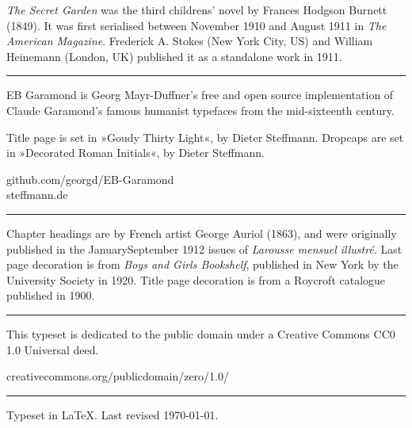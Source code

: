 \documentclass[
paper=5.5in:8.5in,
]{scrbook}
\begin{document}
\centering
\begin{minipage}{\textwidth}
\textit{The Secret Garden} was the third childrens' novel by Frances Hodgson Burnett (1849). It was first serialised between November 1910 and August 1911 in \textit{The American Magazine}. Frederick A. Stokes (New York City, US) and William Heinemann (London, UK) published it as a standalone work in 1911.
\end{minipage}
\vfill
\rule{0.5\textwidth}{.4pt}
\vfill
\begin{minipage}{\textwidth}
EB Garamond is Georg Mayr-Duffner's free and open source implementation of Claude Garamond’s famous humanist typefaces from the mid-sixteenth century.
\end{minipage}
\vfill
\begin{minipage}{\textwidth}
Title page is set in »Goudy Thirty Light«, by Dieter Steffmann. Dropcaps are set in »Decorated Roman Initials«, by Dieter Steffmann.
\end{minipage}
\vfill
github.com/georgd/EB-Garamond\\
steffmann.de\\
\vfill
\rule{0.5\textwidth}{.4pt}
\vfill
\begin{minipage}{\textwidth}
Chapter headings are by French artist George Auriol (1863), and were originally published in the January\textendash September 1912 issues of \textit{Larousse mensuel illustré}. Last page decoration is from \textit{Boys and Girls Bookshelf}, published in New York by the University Society in 1920. Title page decoration is from a Roycroft catalogue published in 1900.
\end{minipage}

\vfill
\rule{0.5\textwidth}{.4pt}
\vfill

\begin{minipage}{\textwidth}
This typeset is dedicated to the public domain under a Creative Commons CC0 1.0 Universal deed.\end{minipage}
\vfill
creativecommons.org/publicdomain/zero/1.0/
\vfill
\rule{0.5\textwidth}{.4pt}
\vfill

Typeset in \LaTeX{}. Last revised \today.
\thispagestyle{empty}
\end{document}
